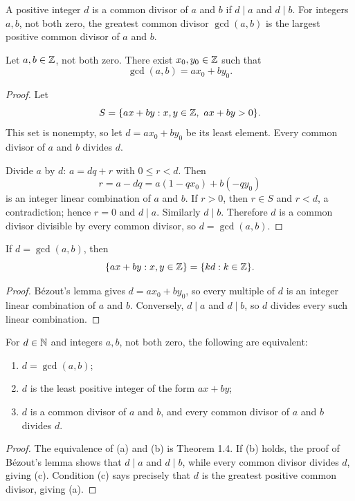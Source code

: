 \begin{de}
A positive integer $d$ is a common divisor of $a$ and $b$ if $d\mid a$ and $d\mid b$.  For integers $a,b$, not both zero, the greatest common divisor $\gcd(a,b)$ is the largest positive common divisor of $a$ and $b$.
\end{de}

\begin{thm}
Let $a,b\in\mathbb{Z}$, not both zero.  There exist $x_0,y_0\in\mathbb{Z}$ such that
\[
 \gcd(a,b)=ax_0+by_0.
\]
\end{thm}
\begin{proof}
Let
\[
 S=\{ax+by:x,y\in\Z,\ ax+by>0\}.
\]
This set is nonempty, so let $d=ax_0+by_0$ be its least element.  Every common divisor of $a$ and $b$ divides $d$.

Divide $a$ by $d$: $a=dq+r$ with $0\le r<d$.  Then
\[
 r=a-dq=a(1-qx_0)+b(-qy_0)
\]
is an integer linear combination of $a$ and $b$.  If $r>0$, then $r\in S$ and $r<d$, a contradiction; hence $r=0$ and $d\mid a$.  Similarly $d\mid b$.  Therefore $d$ is a common divisor divisible by every common divisor, so $d=\gcd(a,b)$.
\end{proof}

\begin{cor}
If $d=\gcd(a,b)$, then
\[
 \{ax+by:x,y\in\mathbb{Z}\}=\{kd:k\in\mathbb{Z}\}.
\]
\end{cor}
\begin{proof}
B\'ezout's lemma gives $d=ax_0+by_0$, so every multiple of $d$ is an integer linear combination of $a$ and $b$.  Conversely, $d\mid a$ and $d\mid b$, so $d$ divides every such linear combination.
\end{proof}

\begin{thm}
For $d\in\mathbb{N}$ and integers $a,b$, not both zero, the following are equivalent:
\begin{enumerate}[label=(\alph*)]
\item $d=\gcd(a,b)$;
\item $d$ is the least positive integer of the form $ax+by$;
\item $d$ is a common divisor of $a$ and $b$, and every common divisor of $a$ and $b$ divides $d$.
\end{enumerate}
\end{thm}
\begin{proof}
The equivalence of (a) and (b) is Theorem 1.4.  If (b) holds, the proof of B\'ezout's lemma shows that $d\mid a$ and $d\mid b$, while every common divisor divides $d$, giving (c).  Condition (c) says precisely that $d$ is the greatest positive common divisor, giving (a).
\end{proof}


